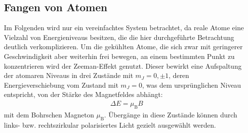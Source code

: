 \documentclass[11pt, a4paper]{article}
\numberwithin{equation}{section}
\begin{document}
\subsection{Fangen von Atomen}
Im Folgenden wird nur ein vereinfachtes System betrachtet, da reale Atome eine Vielzahl von Energieniveaus besitzen, die die hier durchgeführte Betrachtung deutlich verkomplizieren.
Um die gekühlten Atome, die sich zwar mit geringerer Geschwindigkeit aber weiterhin frei bewegen, an einem bestimmten Punkt zu konzentrieren wird der Zeeman-Effekt genutzt.
Dieser bewirkt eine Aufspaltung der atomaren Niveaus in drei Zustände mit $m_J = 0, \pm1$, deren Energieverschiebung vom Zustand mit $m_J=0$, was dem ursprünglichen Niveau entspricht, von der Stärke des Magnetfeldes abhängt:
\begin{align}
	\Delta E =\mu_\mathrm{B}B
\end{align}
mit dem Bohrschen Magneton $\mu_\mathrm{B}$.
Übergänge in diese Zustände können durch links- bzw. rechtszirkular polarisiertes Licht gezielt ausgewählt werden.
\end{document}
